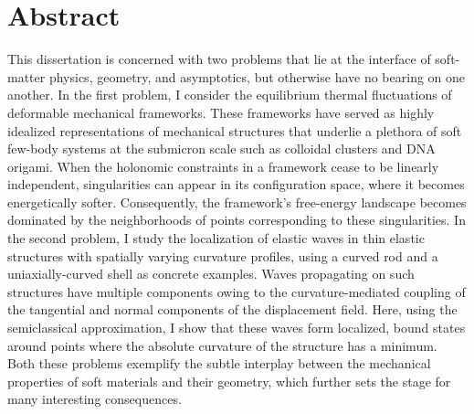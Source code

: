 


\frontmatter


%   


\chapter*{Abstract}
\thispagestyle{empty}

This dissertation is concerned with two problems that lie at the interface of soft-matter physics, geometry, and asymptotics, but otherwise have no bearing on one another.  In the first problem, I consider the equilibrium thermal fluctuations of deformable mechanical frameworks.  These frameworks have served as highly idealized representations of mechanical structures that underlie a plethora of soft few-body systems at the submicron scale such as colloidal clusters and DNA origami.  When the holonomic constraints in a framework cease to be linearly independent, singularities can appear in its configuration space, where it becomes energetically softer.  Consequently, the framework's free-energy landscape becomes dominated by the neighborhoods of points corresponding to these singularities.  In the second problem, I study the localization of elastic waves in thin elastic structures with spatially varying curvature profiles, using a curved rod and a uniaxially-curved shell as concrete examples.  Waves propagating on such structures have multiple components owing to the curvature-mediated coupling of the tangential and normal components of the displacement field.  Here, using the semiclassical approximation, I show that these waves form localized, bound states around points where the absolute curvature of the structure has a minimum.  Both these problems exemplify the subtle interplay between the mechanical properties of soft materials and their geometry, which further sets the stage for many interesting consequences.

\ifdeadtree
  \blankpage
\fi

